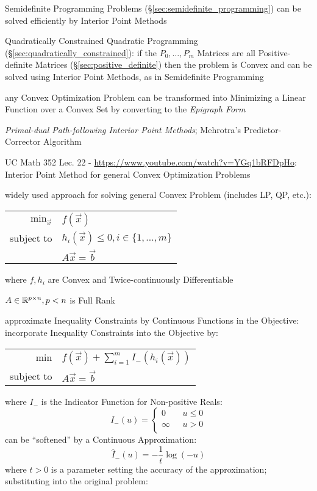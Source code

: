 Semidefinite Programming Problems (\S\ref{sec:semidefinite_programming})
can be solved efficiently by Interior Point Methods

Quadratically Constrained Quadratic Programming
(\S\ref{sec:quadratically_constrained}): if the $P_0,\ldots,P_m$ Matrices are
all Positive-definite Matrices (\S\ref{sec:positive_definite}) then the problem
is Convex and can be solved using Interior Point Methods, as in Semidefinite
Programming

any Convex Optimization Problem can be transformed into Minimizing a Linear
Function over a Convex Set by converting to the \emph{Epigraph Form}

\emph{Primal-dual Path-following Interior Point Methods}; Mehrotra's
Predictor-Corrector Algorithm

\asterism

UC Math 352 Lec. 22 - \url{https://www.youtube.com/watch?v=YGq1bRFDpHo}:
Interior Point Method for general Convex Optimization Problems

widely used approach for solving general Convex Problem (includes LP, QP,
etc.):

\begin{tabular}{r l}
  $\mathrm{min}_{\vec{x}}$ & $f(\vec{x})$     \\
  subject to               & $h_i(\vec{x}) \leq 0, i \in \{1,\ldots,m\}$ \\
                           & $A\vec{x} = \vec{b}$   \\
\end{tabular}

where $f, h_i$ are Convex and Twice-continuously Differentiable

$A \in \mathbb{R}^{p \times n}, p < n$ is Full Rank

approximate Inequality Constraints by Continuous Functions in the Objective:
incorporate Inequality Constraints into the Objective by:

\begin{tabular}{r l}
  $\mathrm{min}$ & $f(\vec{x}) + \sum_{i=1}^m I_{-} (h_i(\vec{x}))$ \\
  subject to     & $A\vec{x} = \vec{b}$ \\
\end{tabular}

where $I_{-}$ is the Indicator Function for Non-positive Reals:
\[
  I_{-}(u) = \begin{cases}
    0       & \ \ \ u \leq 0 \\
    \infty  & \ \ \ u >    0 \\
  \end{cases}
\]
can be ``softened'' by a Continuous Approximation:
\[
  \hat{I}_{-}(u) = -\frac{1}{t} \log (-u)
\]
where $t > 0$ is a parameter setting the accuracy of the approximation;
substituting into the original problem:


